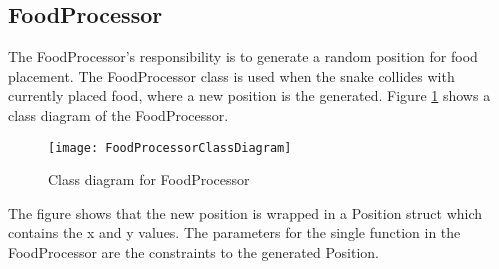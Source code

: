 \subsection{FoodProcessor}
	The FoodProcessor's responsibility is to generate a random position for food placement. The FoodProcessor class is used when the snake collides with currently placed food, where a new position is the generated. Figure \ref{fig:classFood} shows a class diagram of the FoodProcessor.

		\begin{figure}[H]
			\centering
			\texttt{[image: FoodProcessorClassDiagram]}
			\caption{Class diagram for FoodProcessor}
			\label{fig:classFood}
		\end{figure}
		
	The figure shows that the new position is wrapped in a Position struct which contains the x and y values. The parameters for the single function in the FoodProcessor are the constraints to the generated Position.	